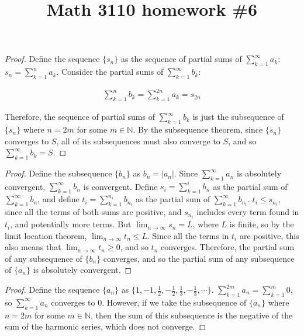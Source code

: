 

\title{Math 3110 homework \#6}
\author{\name}
\maketitle

\begin{proof}
  Define the sequence $\{s_n\}$ as the sequence of partial sums of $\sum_{k = 1}^{\infty} a_k$: $s_n = \sum_{k = 1}^{n} a_k$. Consider the partial sums of $\sum_{k = 1}^{\infty} b_k$:

  \begin{align*}
    \sum_{k = 1}^{n} b_k = \sum_{k = 1}^{2n} a_k = s_{2n}
  \end{align*}

  Therefore, the sequence of partial sums of $\sum_{k = 1}^{\infty} b_k$ is just the subsequence of $\{s_n\}$ where $n = 2m$ for some $m \in \mathbb{N}$. By the subsequence theorem, since $\{s_n\}$ converges to $S$, all of its subsequences must also converge to $S$, and so  $\sum_{k = 1}^{\infty} b_k = S$.
\end{proof}


\begin{proof}
  Define the subsequence $\{b_n\}$ as $b_n = |a_n|$. Since $\sum_{k = 1}^{\infty} a_n$ is absolutely convergent, $\sum_{k = 1}^{\infty} b_n$ is convergent. Define $s_i = \sum_{k = 1}^{i} b_n$ as the partial sum of $\sum_{k = 1}^{\infty} b_n$, and define $t_i = \sum_{k = 1}^{n_i} b_{n_i}$ as the partial sum of $\sum_{k = 1}^{\infty} b_{n_i}$. $t_i \leq s_{n_i}$, since all the terms of both sums are positive, and $s_{n_i}$ includes every term found in $t_i$, and potentially more terms. But $\lim_{n \rightarrow \infty} s_n = L$, where $L$ is finite, so by the limit location theorem, $\lim_{n \rightarrow \infty} t_n \leq L$. Since all the terms in $t_i$ are positive, this also means that $\lim_{n \rightarrow \infty} t_n \geq 0$, and so $t_n$ converges. Therefore, the partial sum of any subsequence of $\{b_n\}$ converges, and so the partial sum of any subsequence of $\{a_n\}$ is absolutely convergent.
\end{proof}

\begin{proof}
  Define the sequence $\{a_n\}$ as $\{1, -1, \frac{1}{2}, -\frac{1}{2}, \frac{1}{3}, -\frac{1}{3}, \cdots \}$. $\sum_{k = 1}^{2m} a_n = \sum_{k = 1}^{m} 0$, so $\sum_{k = 1}^{\infty} a_n$ converges to 0. However, if we take the subsequence of $\{a_n\}$ where $n = 2m$ for some $m \in \mathbb{N}$, then the sum of this subsequence is the negative of the sum of the harmonic series, which does not converge.
\end{proof}

